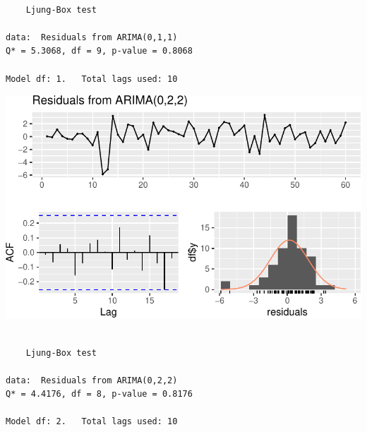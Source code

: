 \documentclass[
  letterpaper,
  DIV=11,
  numbers=noendperiod]{scrartcl}
\begin{document}
\begin{verbatim}

    Ljung-Box test

data:  Residuals from ARIMA(0,1,1)
Q* = 5.3068, df = 9, p-value = 0.8068

Model df: 1.   Total lags used: 10
\end{verbatim}

\includegraphics{Smith_Gabrielle_EDS222Final_files/figure-pdf/unnamed-chunk-15-1.pdf}

\begin{verbatim}

    Ljung-Box test

data:  Residuals from ARIMA(0,2,2)
Q* = 4.4176, df = 8, p-value = 0.8176

Model df: 2.   Total lags used: 10
\end{verbatim}
\end{document}
